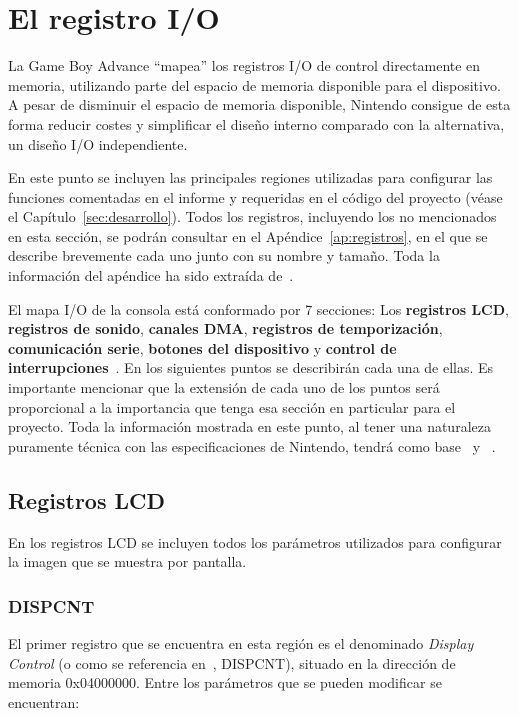 \section{El registro I/O}
La Game Boy Advance ``mapea'' los registros I/O de control directamente en memoria, utilizando parte del espacio de memoria disponible para el dispositivo. A pesar de disminuir el espacio de memoria disponible, Nintendo consigue de esta forma reducir costes y simplificar el diseño interno comparado con la alternativa, un diseño I/O independiente.

En este punto se incluyen las principales regiones utilizadas para configurar las funciones comentadas en el informe y requeridas en el código del proyecto (véase el Capítulo~\ref{sec:desarrollo}). Todos los registros, incluyendo los no mencionados en esta sección, se podrán consultar en el Apéndice~\ref{ap:registros}, en el que se describe brevemente cada uno junto con su nombre y tamaño. Toda la información del apéndice ha sido extraída de~\cite{bib:gbatek}.

El mapa I/O de la consola está conformado por 7 secciones: Los \textbf{registros LCD}, \textbf{registros de sonido}, \textbf{canales DMA}, \textbf{registros de temporización}, \textbf{comunicación serie}, \textbf{botones del dispositivo} y \textbf{control de interrupciones}~\cite{bib:gbatek}. En los siguientes puntos se describirán cada una de ellas. Es importante mencionar que la extensión de cada uno de los puntos será proporcional a la importancia que tenga esa sección en particular para el proyecto. Toda la información mostrada en este punto, al tener una naturaleza puramente técnica con las especificaciones de Nintendo, tendrá como base~\cite{bib:gba_manual} y~\cite{bib:gbatek} .

\subsection{Registros LCD}\label{sec:dispcnt}
En los registros LCD se incluyen todos los parámetros utilizados para configurar la imagen que se muestra por pantalla.

\subsubsection{DISPCNT}
El primer registro que se encuentra en esta región es el denominado \textit{Display Control} (o como se referencia en~\cite{bib:gbatek}, DISPCNT), situado en la dirección de memoria 0x04000000. Entre los parámetros que se pueden modificar se encuentran:


